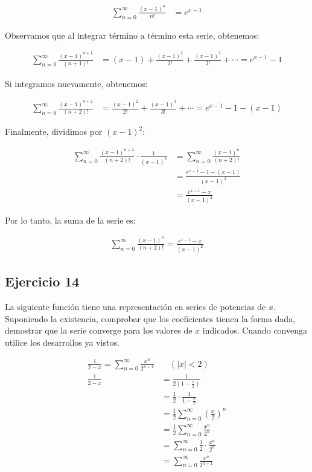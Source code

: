 \documentclass{article}
\begin{document}
    \begin{align*}
    \sum_{n=0}^{\infty} \frac{(x-1)^{n}}{n!} &= e^{x-1}
    \end{align*}

    Observamos que al integrar término a término esta serie, obtenemos:

    \begin{align*}
    \sum_{n=0}^{\infty} \frac{(x-1)^{n+1}}{(n+1)!} &= (x-1)+\frac{(x-1)^{2}}{2!}+\frac{(x-1)^{3}}{3!}+\cdots = e^{x-1}-1
    \end{align*}

    Si integramos nuevamente, obtenemos:

    \begin{align*}
    \sum_{n=0}^{\infty} \frac{(x-1)^{n+2}}{(n+2)!} &= \frac{(x-1)^{2}}{2!}+\frac{(x-1)^{3}}{3!}+\cdots = e^{x-1}-1-(x-1)
    \end{align*}

    Finalmente, dividimos por $(x-1)^{2}$:

    \begin{align*}
    \sum_{n=0}^{\infty} \frac{(x-1)^{n+2}}{(n+2)!} \cdot \frac{1}{(x-1)^{2}} &= \sum_{n=0}^{\infty} \frac{(x-1)^{n}}{(n+2)!} \\
    &= \frac{e^{x-1} - 1 - (x-1)}{(x-1)^{2}} \\
    &= \frac{e^{x-1} - x}{(x-1)^{2}}
    \end{align*}

    Por lo tanto, la suma de la serie es:

    \begin{align*}
    \sum_{n=0}^{\infty} \frac{(x-1)^{n}}{(n+2)!} = \frac{e^{x-1} - x}{(x-1)^{2}}
    \end{align*}

    \subsection*{Ejercicio 14}

    La siguiente función tiene una representación en series de potencias de $x$. Suponiendo la existencia, comprobar que los coeficientes tienen la forma dada, demostrar que la serie converge para los valores de $x$ indicados. Cuando convenga utilice los desarrollos ya vistos.

    $$
    \begin{aligned}
    \frac{1}{2-x}=\sum_{n=0}^{\infty} \frac{x^{n}}{2^{n+1}} & \quad(|x|<2) \\
    \frac{1}{2-x} & =\frac{1}{2\left(1-\frac{x}{2}\right)} \\
    & =\frac{1}{2} \cdot \frac{1}{1-\frac{x}{2}} \\
    & =\frac{1}{2} \sum_{n=0}^{\infty}\left(\frac{x}{2}\right)^{n} \\
    & =\frac{1}{2} \sum_{n=0}^{\infty} \frac{x^{n}}{2^{n}} \\
    & =\sum_{n=0}^{\infty} \frac{1}{2} \cdot \frac{x^{n}}{2^{n}} \\
    & =\sum_{n=0}^{\infty} \frac{x^{n}}{2^{n+1}}
    \end{aligned}
    $$
\end{document}
